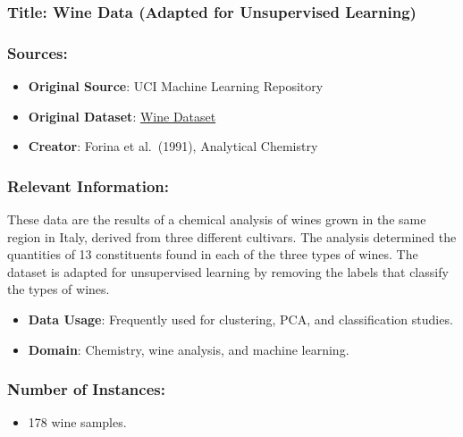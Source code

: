 \documentclass[
]{article}
\providecommand{\tightlist}{%
  \setlength{\itemsep}{0pt}\setlength{\parskip}{0pt}}
\begin{document}
\subsubsection{Title: Wine Data (Adapted for Unsupervised
Learning)}\label{title-wine-data-adapted-for-unsupervised-learning}

\subsubsection{Sources:}\label{sources}

\begin{itemize}
\tightlist
\item
  \textbf{Original Source}: UCI Machine Learning Repository
\item
  \textbf{Original Dataset}:
  \href{https://archive.ics.uci.edu/ml/datasets/wine}{Wine Dataset}
\item
  \textbf{Creator}: Forina et al.~(1991), Analytical Chemistry
\end{itemize}

\subsubsection{Relevant Information:}\label{relevant-information}

These data are the results of a chemical analysis of wines grown in the
same region in Italy, derived from three different cultivars. The
analysis determined the quantities of 13 constituents found in each of
the three types of wines. The dataset is adapted for unsupervised
learning by removing the labels that classify the types of wines.

\begin{itemize}
\tightlist
\item
  \textbf{Data Usage}: Frequently used for clustering, PCA, and
  classification studies.
\item
  \textbf{Domain}: Chemistry, wine analysis, and machine learning.
\end{itemize}

\subsubsection{Number of Instances:}\label{number-of-instances}

\begin{itemize}
\tightlist
\item
  178 wine samples.
\end{itemize}
\end{document}
